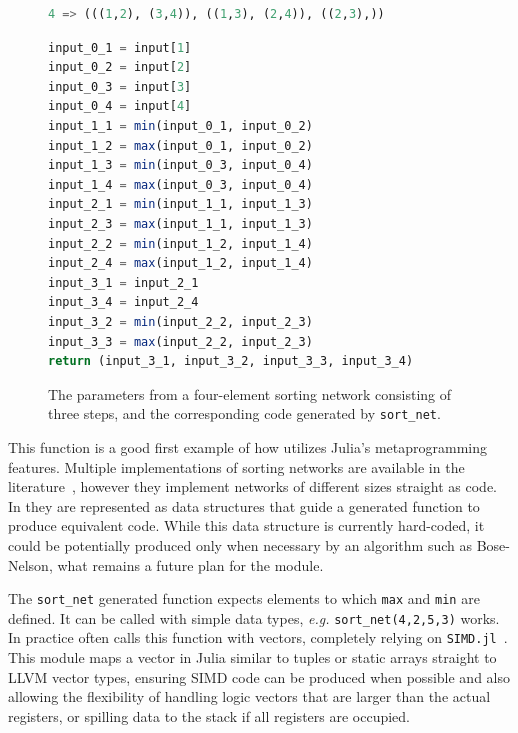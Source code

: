 \documentclass{juliacon}
\begin{document}
\begin{figure}[htb]
\begin{lstlisting}[language = Julia]
4 => (((1,2), (3,4)), ((1,3), (2,4)), ((2,3),))
\end{lstlisting}
\begin{lstlisting}[language = Julia]
input_0_1 = input[1]
input_0_2 = input[2]
input_0_3 = input[3]
input_0_4 = input[4]
input_1_1 = min(input_0_1, input_0_2)
input_1_2 = max(input_0_1, input_0_2)
input_1_3 = min(input_0_3, input_0_4)
input_1_4 = max(input_0_3, input_0_4)
input_2_1 = min(input_1_1, input_1_3)
input_2_3 = max(input_1_1, input_1_3)
input_2_2 = min(input_1_2, input_1_4)
input_2_4 = max(input_1_2, input_1_4)
input_3_1 = input_2_1
input_3_4 = input_2_4
input_3_2 = min(input_2_2, input_2_3)
input_3_3 = max(input_2_2, input_2_3)
return (input_3_1, input_3_2, input_3_3, input_3_4)
\end{lstlisting}
\caption{The parameters from a four-element sorting network consisting of three steps, and the corresponding code generated by {\tt sort\_net}.}
\label{fig:sort-net-listing}
\end{figure}

This function is a good first example of how \chipsort utilizes Julia's metaprogramming features. Multiple implementations of sorting networks are available in the literature~\cite{DBLP:journals/pvldb/ChhuganiNLMHCBKD08,sortingnetworksjl,ultrasort}, however they implement networks of different sizes straight as code. In \chipsort they are represented as data structures that guide a generated function to produce equivalent code. While this data structure is currently hard-coded, it could be potentially produced only when necessary by an algorithm such as Bose-Nelson, what remains a future plan for the module.

The {\tt sort\_net} generated function expects elements to which {\tt max} and {\tt min} are defined. It can be called with simple data types, {\em e.g.} {\tt sort\_net(4,2,5,3)} works. In practice \chipsort often calls this function with vectors, completely relying on {\tt SIMD.jl}~\cite{erik_schnetter_2019_2592633}. This module maps a vector in Julia similar to tuples or static arrays straight to LLVM vector types, ensuring SIMD code can be produced when possible and also allowing the flexibility of handling logic vectors that are larger than the actual registers, or spilling data to the stack if all registers are occupied.
\end{document}
